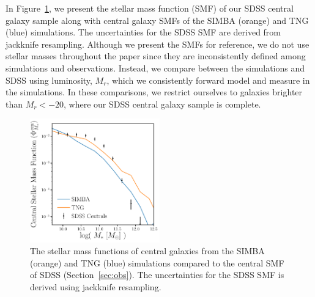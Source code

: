 In Figure~\ref{fig:smf}, we present the stellar mass function (SMF) of our SDSS
central galaxy sample along with central galaxy SMFs of the SIMBA (orange) and
TNG (blue) simulations. The uncertainties for the SDSS SMF are derived from
jackknife resampling. Although we present the SMFs for reference, we do not use
stellar masses throughout the paper since they are inconsistently defined among
simulations and observations. Instead, we compare between the simulations and
SDSS using luminosity, $M_r$, which we consistently forward model and measure
in the simulations. In these comparisons, we restrict ourselves to galaxies
brighter than $M_r < -20$, where our SDSS central galaxy sample is complete. 

\begin{figure}
\begin{center}
\includegraphics[width=0.5\textwidth]{figs/smfs.pdf} 
    \caption{The stellar mass functions of central galaxies from the SIMBA
    (orange) and TNG (blue) simulations compared to the central SMF of SDSS
    (Section~\ref{sec:obs}). The uncertainties for the SDSS SMF is derived
    using jackknife resampling.}
\label{fig:smf}
\end{center}
\end{figure}

